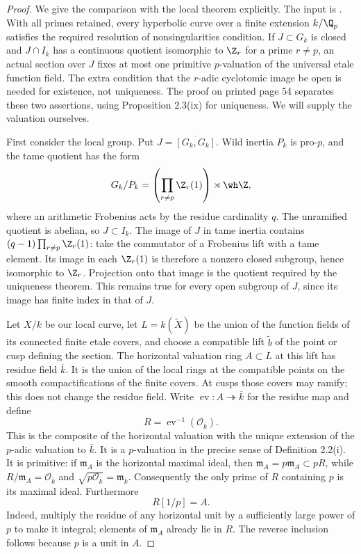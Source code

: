 \begin{proof}
We give the comparison with the local theorem explicitly. The input is
\citet[Theorem A, Definition 2.2(i), Proposition 2.3(v), and
Proposition 2.4(vii)]{MT2024}. With all primes retained, every hyperbolic curve
over a finite extension $k/\Q_p$ satisfies the required resolution of
nonsingularities condition. If $J\subset G_k$ is closed and
$J\cap I_k$ has a continuous quotient isomorphic to $\Z_r$ for a prime
$r\ne p$, an actual section over $J$ fixes at most one primitive
$p$-valuation of the universal etale function field. The extra condition that
the $r$-adic cyclotomic image be open is needed for existence, not uniqueness.
The proof on printed page 54 separates these two assertions, using
Proposition 2.3(ix) for uniqueness. We will supply the valuation ourselves.

First consider the local group. Put
$J=\overline{[G_k,G_k]}$. Wild inertia $P_k$ is pro-$p$, and the tame
quotient has the form
\[
 G_k/P_k=\left(\prod_{r\ne p}\Z_r(1)\right)\rtimes\wh\Z,
\]
where an arithmetic Frobenius acts by the residue cardinality $q$.
The unramified quotient is abelian, so $J\subset I_k$.
The image of $J$ in tame inertia contains
$(q-1)\prod_{r\ne p}\Z_r(1)$: take the commutator of a Frobenius lift
with a tame element. Its image in each $\Z_r(1)$ is therefore a nonzero
closed subgroup, hence isomorphic to $\Z_r$. Projection onto that image
is the quotient required by the uniqueness theorem. This remains true for
every open subgroup of $J$, since its image has finite index in that of $J$.

Let $X/k$ be our local curve, let $L=k(\widetilde X)$ be the union of
the function fields of its connected finite etale covers, and choose a
compatible lift $\widetilde b$ of the point or cusp defining the section.
The horizontal valuation ring $A\subset L$ at this lift has residue field
$\overline k$. It is the union of the local rings at the compatible points
on the smooth compactifications of the finite covers. At cusps those covers
may ramify; this does not change the residue field. Write
$\operatorname{ev}:A\twoheadrightarrow\overline k$ for the residue map and
define
\[
 R=\operatorname{ev}^{-1}(\mathcal O_{\overline k}).
\]
This is the composite of the horizontal valuation with the unique extension
of the $p$-adic valuation to $\overline k$. It is a $p$-valuation in the
precise sense of Definition 2.2(i). It is primitive: if $\mathfrak m_A$
is the horizontal maximal ideal, then
$\mathfrak m_A=p\mathfrak m_A\subset pR$, while
$R/\mathfrak m_A=\mathcal O_{\overline k}$ and
$\sqrt{p\mathcal O_{\overline k}}=\mathfrak m_{\overline k}$.
Consequently the only prime of $R$ containing $p$ is its maximal ideal.
Furthermore
\[
                         R[1/p]=A.                       \tag{A.1}
\]
Indeed, multiply the residue of any horizontal unit by a sufficiently large
power of $p$ to make it integral; elements of $\mathfrak m_A$ already lie
in $R$. The reverse inclusion follows because $p$ is a unit in $A$.


\end{proof}
